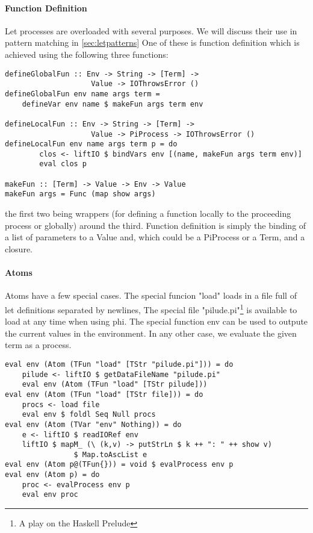 \paragraph{Function Definition}
Let processes are overloaded with several purposes. We will discuss their use in pattern matching in \ref{sec:letpatterns} One of these is function definition which is achieved using the following three functions:
\begin{verbatim}
defineGlobalFun :: Env -> String -> [Term] -> 
                    Value -> IOThrowsError ()
defineGlobalFun env name args term = 
    defineVar env name $ makeFun args term env

defineLocalFun :: Env -> String -> [Term] -> 
                    Value -> PiProcess -> IOThrowsError ()
defineLocalFun env name args term p = do
        clos <- liftIO $ bindVars env [(name, makeFun args term env)]
        eval clos p

makeFun :: [Term] -> Value -> Env -> Value
makeFun args = Func (map show args)
\end{verbatim}
the first two being wrappers (for defining a function locally to the proceeding process or globally) around the third. Function definition is simply the binding of a list of parameters to a Value and, which could be a PiProcess or a Term, and a closure.

\paragraph{Atoms}
Atoms have a few special cases. The special funcion "load" loads in a file full of let definitions separated by newlines,
The special file "pilude.pi"\footnote{A play on the Haskell Prelude} is available to load at any time when using phi. The special function env can be used to outpute the current values in the environment. In any other case, we evaluate the given term as a process.
\begin{verbatim}
eval env (Atom (TFun "load" [TStr "pilude.pi"])) = do
    pilude <- liftIO $ getDataFileName "pilude.pi"
    eval env (Atom (TFun "load" [TStr pilude]))
eval env (Atom (TFun "load" [TStr file])) = do
    procs <- load file  
    eval env $ foldl Seq Null procs
eval env (Atom (TVar "env" Nothing)) = do
    e <- liftIO $ readIORef env
    liftIO $ mapM_ (\ (k,v) -> putStrLn $ k ++ ": " ++ show v) 
                $ Map.toAscList e
eval env (Atom p@(TFun{})) = void $ evalProcess env p
eval env (Atom p) = do
    proc <- evalProcess env p
    eval env proc
\end{verbatim}
